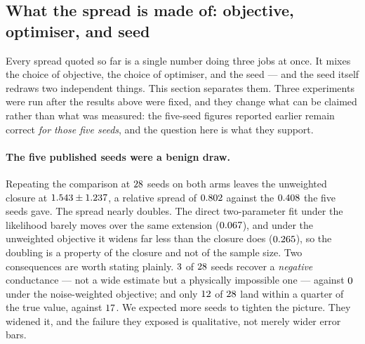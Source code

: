 \documentclass{article}
\begin{document}
\subsection{What the spread is made of: objective, optimiser, and seed}
\label{sec:results-decomposition}

Every spread quoted so far is a single number doing three jobs at once. It
mixes the choice of objective, the choice of optimiser, and the seed --- and the
seed itself redraws two independent things. This section separates them. Three
experiments were run after the results above were fixed, and they change what can
be claimed rather than what was measured: the five-seed figures reported earlier
remain correct \emph{for those five seeds}, and the question here is what they
support.

\paragraph{The five published seeds were a benign draw.}
Repeating the comparison at $28$ seeds on both arms leaves the
unweighted closure at $1.543 \pm 1.237$, a relative spread
of $0.802$ against the $0.408$ the five seeds gave. The
spread nearly doubles. The direct two-parameter fit under the likelihood barely
moves over the same extension ($0.067$), and under the unweighted
objective it widens far less than the closure does ($0.265$), so the
doubling is a property of the closure and not of the sample size. Two consequences are worth stating plainly. $3$ of
$28$ seeds recover a \emph{negative} conductance --- not a wide estimate
but a physically impossible one --- against $0$ under the
noise-weighted objective; and only $12$ of $28$ land within
a quarter of the true value, against $17$. We expected more seeds to
tighten the picture. They widened it, and the failure they exposed is qualitative,
not merely wider error bars.
\end{document}

